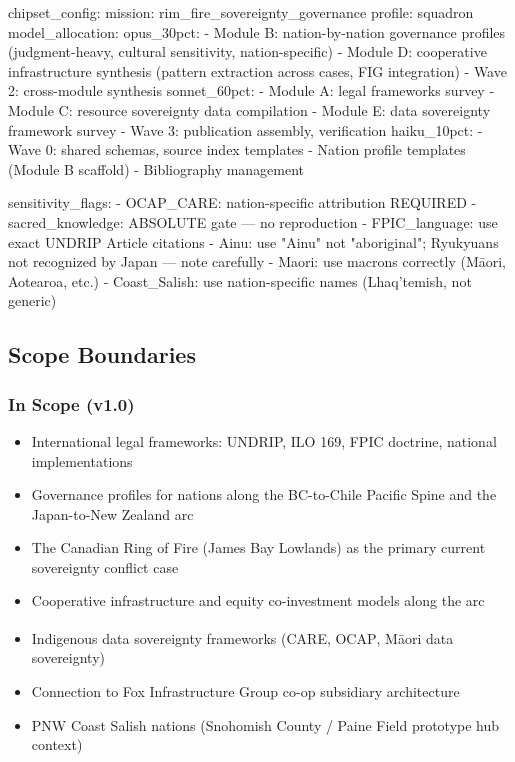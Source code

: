 \documentclass[11pt,letterpaper]{article}
\begin{document}
\begin{asciibox}
chipset_config:
  mission: rim_fire_sovereignty_governance
  profile: squadron
  model_allocation:
    opus_30pct:
      - Module B: nation-by-nation governance profiles
        (judgment-heavy, cultural sensitivity, nation-specific)
      - Module D: cooperative infrastructure synthesis
        (pattern extraction across cases, FIG integration)
      - Wave 2: cross-module synthesis
    sonnet_60pct:
      - Module A: legal frameworks survey
      - Module C: resource sovereignty data compilation
      - Module E: data sovereignty framework survey
      - Wave 3: publication assembly, verification
    haiku_10pct:
      - Wave 0: shared schemas, source index templates
      - Nation profile templates (Module B scaffold)
      - Bibliography management

  sensitivity_flags:
    - OCAP_CARE: nation-specific attribution REQUIRED
    - sacred_knowledge: ABSOLUTE gate — no reproduction
    - FPIC_language: use exact UNDRIP Article citations
    - Ainu: use "Ainu" not "aboriginal"; Ryukyuans not recognized by Japan — note carefully
    - Maori: use macrons correctly (Māori, Aotearoa, etc.)
    - Coast_Salish: use nation-specific names (Lhaq'temish, not generic)
\end{asciibox}

\subsection{Scope Boundaries}

\subsubsection{In Scope (v1.0)}

\begin{itemize}
  \item International legal frameworks: UNDRIP, ILO 169, FPIC doctrine, national implementations
  \item Governance profiles for nations along the BC-to-Chile Pacific Spine and the Japan-to-New Zealand arc
  \item The Canadian Ring of Fire (James Bay Lowlands) as the primary current sovereignty conflict case
  \item Cooperative infrastructure and equity co-investment models along the arc
  \item Indigenous data sovereignty frameworks (CARE, OCAP\textsuperscript{\textregistered}, Māori data sovereignty)
  \item Connection to Fox Infrastructure Group co-op subsidiary architecture
  \item PNW Coast Salish nations (Snohomish County / Paine Field prototype hub context)
\end{itemize}
\end{document}
